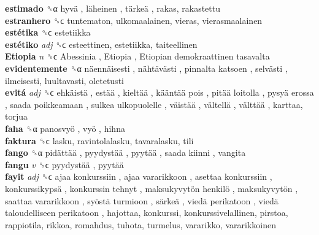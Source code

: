 \textbf{estimado} ␝α   hyvä ,  läheinen ,  tärkeä , rakas, rakastettu  \\
\textbf{estranhero} ␝ϲ  tuntematon, ulkomaalainen, vieras, vierasmaalainen  \\
\textbf{estétika} ␝ϲ  estetiikka  \\
\textbf{estétiko} \emph{adj}  ␝ϲ  esteettinen, estetiikka, taiteellinen  \\
\textbf{Etiopia} \emph{n}  ␝ϲ   Abessinia ,  Etiopia ,  Etiopian demokraattinen tasavalta   \\
\textbf{evidentemente} ␝α   näennäisesti ,  nähtävästi ,  pinnalta katsoen ,  selvästi , ilmeisesti, luultavasti, oletetusti  \\
\textbf{evitá} \emph{adj}  ␝ϲ   ehkäistä ,  estää ,  kieltää ,  kääntää pois ,  pitää loitolla ,  pysyä erossa ,  saada poikkeamaan ,  sulkea ulkopuolelle ,  väistää ,  vältellä ,  välttää , karttaa, torjua  \\
\textbf{faha} ␝α   panosvyö ,  vyö , hihna  \\
\textbf{faktura} ␝ϲ  lasku, ravintolalasku, tavaralasku, tili  \\
\textbf{fango} ␝α   pidättää ,  pyydystää ,  pyytää ,  saada kiinni , vangita  \\
\textbf{fangu} \emph{v}  ␝ϲ   pyydystää ,  pyytää   \\
\textbf{fayit} \emph{adj}  ␝ϲ   ajaa konkurssiin ,  ajaa vararikkoon ,  asettaa konkurssiin ,  konkurssikypsä ,  konkurssin tehnyt ,  maksukyvytön henkilö ,  maksukyvytön ,  saattaa vararikkoon ,  syöstä turmioon ,  särkeä ,  viedä perikatoon ,  viedä taloudelliseen perikatoon , hajottaa, konkurssi, konkurssivelallinen, pirstoa, rappiotila, rikkoa, romahdus, tuhota, turmelus, vararikko, vararikkoinen  \\
